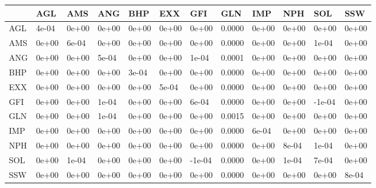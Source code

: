 \documentclass[11pt,preprint, authoryear]{elsarticle}
\let\origtable\table
\let\endorigtable\endtable
\renewenvironment{table}[1][2] {
    \expandafter\origtable\expandafter[H]
} {
    \endorigtable
}
\numberwithin{equation}{section}
\numberwithin{figure}{section}
\numberwithin{table}{section}
\begin{document}
\begin{table}[H]

\caption{\label{tab:Covariance Matrix_R}Covariance Matrix: Resources}
\centering
\begin{tabular}[t]{l|l|l|l|l|l|l|l|l|l|l|l}
\hline
  & AGL & AMS & ANG & BHP & EXX & GFI & GLN & IMP & NPH & SOL & SSW\\
\hline
AGL & 4e-04 & 0e+00 & 0e+00 & 0e+00 & 0e+00 & 0e+00 & 0.0000 & 0e+00 & 0e+00 & 0e+00 & 0e+00\\
\hline
AMS & 0e+00 & 6e-04 & 0e+00 & 0e+00 & 0e+00 & 0e+00 & 0.0000 & 0e+00 & 0e+00 & 1e-04 & 0e+00\\
\hline
ANG & 0e+00 & 0e+00 & 5e-04 & 0e+00 & 0e+00 & 1e-04 & 0.0001 & 0e+00 & 0e+00 & 0e+00 & 0e+00\\
\hline
BHP & 0e+00 & 0e+00 & 0e+00 & 3e-04 & 0e+00 & 0e+00 & 0.0000 & 0e+00 & 0e+00 & 0e+00 & 0e+00\\
\hline
EXX & 0e+00 & 0e+00 & 0e+00 & 0e+00 & 5e-04 & 0e+00 & 0.0000 & 0e+00 & 0e+00 & 0e+00 & 0e+00\\
\hline
GFI & 0e+00 & 0e+00 & 1e-04 & 0e+00 & 0e+00 & 6e-04 & 0.0000 & 0e+00 & 0e+00 & -1e-04 & 0e+00\\
\hline
GLN & 0e+00 & 0e+00 & 1e-04 & 0e+00 & 0e+00 & 0e+00 & 0.0015 & 0e+00 & 0e+00 & 0e+00 & 0e+00\\
\hline
IMP & 0e+00 & 0e+00 & 0e+00 & 0e+00 & 0e+00 & 0e+00 & 0.0000 & 6e-04 & 0e+00 & 0e+00 & 0e+00\\
\hline
NPH & 0e+00 & 0e+00 & 0e+00 & 0e+00 & 0e+00 & 0e+00 & 0.0000 & 0e+00 & 8e-04 & 1e-04 & 0e+00\\
\hline
SOL & 0e+00 & 1e-04 & 0e+00 & 0e+00 & 0e+00 & -1e-04 & 0.0000 & 0e+00 & 1e-04 & 7e-04 & 0e+00\\
\hline
SSW & 0e+00 & 0e+00 & 0e+00 & 0e+00 & 0e+00 & 0e+00 & 0.0000 & 0e+00 & 0e+00 & 0e+00 & 8e-04\\
\hline
\end{tabular}
\end{table}


\end{document}
